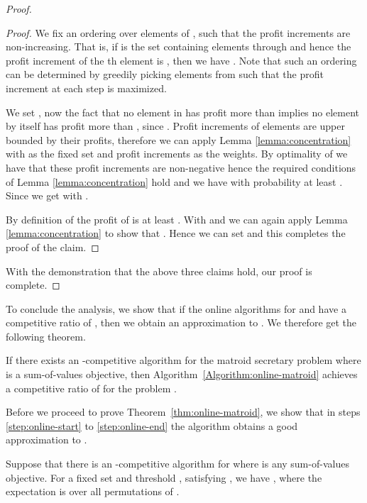 \begin{proof}
\begin{proof}
We fix an ordering over elements of , such that the
profit increments are non-increasing. That is, if  is the set
containing elements  through  and hence the profit increment of
the th element is , then we have . Note that such an ordering can be determined by greedily
picking elements from  such that the profit
increment at each step is maximized.

We set , now the fact that no element in  has
profit more than  implies no element by
itself has profit more than , since
. Profit increments
of elements are upper bounded by their profits, therefore we can apply
Lemma \ref{lemma:concentration} with  as the fixed
set and profit increments as the weights. By optimality of
 we have that these profit increments are
non-negative hence the required conditions of Lemma
\ref{lemma:concentration} hold and we have  with probability at
least .  Since  we get  with
.

By definition of  the profit of  is at least
. With  and  we can again
apply Lemma \ref{lemma:concentration} to show that . Hence we can set  and this completes the proof
of the claim.
\end{proof}

With the demonstration that the above three claims hold, our proof is complete.
\end{proof}

To conclude the analysis, we show that if the online algorithms for
 and  have a
competitive ratio of , then we obtain an 
approximation to . We therefore get the
following theorem.

\begin{theorem}
\label{thm:online-matroid}
If there exists an -competitive algorithm for the matroid
secretary problem  where  is a sum-of-values objective,
then Algorithm~\ref{Algorithm:online-matroid} achieves a competitive ratio of
 for the problem .
\end{theorem}

Before we proceed to prove Theorem~\ref{thm:online-matroid}, we show
that in steps \ref{step:online-start} to \ref{step:online-end} the
algorithm obtains a good approximation to .

\begin{lemma}
  \label{lem:secondstage}
Suppose that there is an -competitive algorithm for
 where  is any sum-of-values objective. For a fixed set
 and threshold , satisfying , we have , where the expectation is over all
permutations  of .
\end{lemma}

